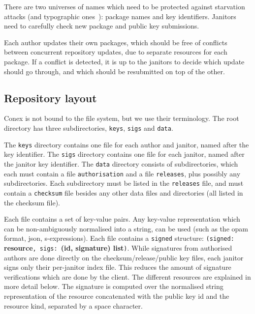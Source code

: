 \documentclass[nocopyrightspace]{sigplanconf}
\begin{document}
There are two universes of names which need to be protected against starvation attacks (and typographic ones~\cite{typo}): package names and key identifiers.
Janitors need to carefully check new package and public key submissions.

Each author updates their own packages, which should be free of conflicts between concurrent repository updates, due to separate resources for each package.
If a conflict is detected, it is up to the janitors to decide which update should go through, and which should be resubmitted on top of the other.

\subsection{Repository layout}
Conex is not bound to the file system, but we use their terminology.
The root directory has three subdirectories, \texttt{keys}, \texttt{sigs} and \texttt{data}.

The \texttt{keys} directory contains one file for each author and janitor, named after the key identifier.
The \texttt{sigs} directory contains one file for each janitor, named after the janitor key identifier.
The \texttt{data} directory consists of subdirectories, which each must contain a file \texttt{authorisation} and a file \texttt{releases}, plus possibly any subdirectories.
Each subdirectory must be listed in the \texttt{releases} file, and must contain a \texttt{checksum} file besides any other data files and directories (all listed in the checksum file).

Each file contains a set of key-value pairs.
Any key-value representation which can be non-ambiguously normalised into a string, can be used (such as the opam format, json, s-expressions).
Each file contains a \texttt{signed} structure: \texttt{(signed: }\textbf{resource}\texttt{, sigs: }\textbf{(id, signature) list}\texttt{)}.
While signatures from authorised authors are done directly on the checksum/release/public key files, each janitor signs only their per-janitor index file.
This reduces the amount of signature verifications which are done by the client.
The different resources are explained in more detail below.
The signature is computed over the normalised string representation of the resource concatenated with the public key id and the resource kind, separated by a space character.
\end{document}
